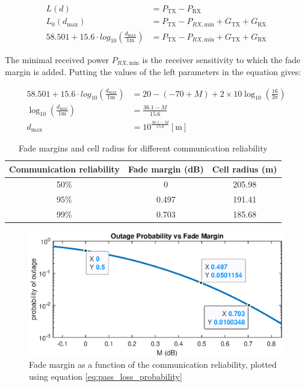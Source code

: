 \documentclass[10pt,a4paper]{ULBreport}
\begin{document}
\begin{align*}
    L(d) &= P_{\text{TX}} - P_{\text{RX}}\\
    L_0(d_\text{max}) &= P_{\text{TX}} - P_{RX, \text{min}} + G_{\text{TX}} + G_{\text{RX}}\\
    58.501 + 15.6 \cdot log_{10} \left(\frac{d_{\text{max}}}{1\text{m}}\right) &= P_{\text{TX}} - P_{RX, \text{min}} + G_{\text{TX}} + G_{\text{RX}}
\end{align*}

The minimal received power $P_{RX, \text{min}}$ is the receiver sensitivity to which the fade margin is added. Putting the values of the left parameters in the equation gives:

\begin{align*}
    58.501 + 15.6 \cdot log_{10} \left(\frac{d_{\text{max}}}{1\text{m}}\right) &= 20 - (-70 + M) + 2 \times 10 \log_{10} \left(\frac{16}{3\pi}\right)\\
    \log_{10} \left(\frac{d_{\text{max}}}{1\text{m}}\right) &= \frac{36.1 - M}{15.6}\\
    d_{\text{max}} &= 10^{\frac{36.1 - M}{15.6}} \left[\text{m}\right]
\end{align*}

\begin{table}[H]
    \centering
    \begin{tabular}{|c|c|c|}
        \hline
        Communication reliability & Fade margin (dB) & Cell radius (m) \\ \hline
        50\% & 0 & 205.98 \\ \hline
        95\% & 0.497 & 191.41 \\ \hline
        99\% & 0.703 & 185.68 \\ \hline
    \end{tabular}
    \caption{Fade margins and cell radius for different communication reliability}
    \label{tab:fade_margins}
\end{table}

\begin{figure}[H]
    \centering
    \includegraphics[width=1\textwidth]{3_7.eps}
    \caption{Fade margin as a function of the communication reliability, plotted using equation \ref{eq:pass_loss_probability}}
    \label{fig:fade_margin}
\end{figure}
\end{document}
